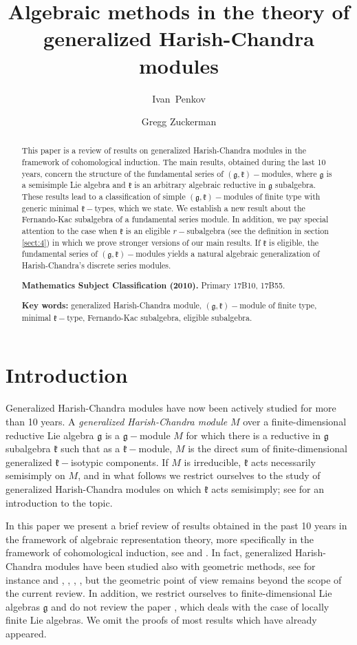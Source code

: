 \documentclass[10pt]{amsart}
\title[Algebraic methods in the theory of generalized Harish-Chandra modules]{Algebraic methods in the theory of generalized Harish-Chandra modules}
\author[Ivan Penkov]{\;Ivan~Penkov}
\author[Gregg Zuckerman]{\;Gregg Zuckerman}
\renewcommand{\gg}{\mathfrak{g}}
\newcommand{\kk}{\mathfrak{k}}
\begin{document}
\begin{abstract}
This paper is a review of results on generalized Harish-Chandra modules in the framework of cohomological induction. The main results, obtained during the last 10 years, concern the structure of the fundamental series of $(\gg,\kk)-$modules, where $\gg$ is a semisimple Lie algebra and $\kk$ is an arbitrary algebraic reductive in $\gg$ subalgebra. These results lead to a classification of simple $(\gg,\kk)-$modules of finite type with generic minimal $\kk-$types, which we state. We establish a new result about the Fernando-Kac subalgebra of a fundamental series module. In addition, we pay special attention to the case when $\kk$ is an eligible $r-$subalgebra (see the definition in section \ref{sect:4}) in which we prove stronger versions of our main results. If $\kk$ is eligible, the fundamental series of $(\gg,\kk)-$modules yields a natural algebraic generalization of Harish-Chandra's discrete series modules. 

\textbf{Mathematics Subject Classification (2010).} Primary 17B10, 17B55. 

\textbf{Key words:} generalized Harish-Chandra module, $(\gg,\kk)-$module of finite type, minimal $\kk-$type, Fernando-Kac subalgebra, eligible subalgebra.
\end{abstract}

\maketitle

\section*{Introduction}\label{sect:intro}
Generalized Harish-Chandra modules have now been actively studied for more than 10 years. A \textit{generalized Harish-Chandra module} $M$ over a finite-dimensional reductive Lie algebra $\gg$ is a $\gg-$module $M$ for which there is a reductive in $\gg$ subalgebra $\kk$ such that as a $\kk-$module, $M$ is the direct sum of finite-dimensional generalized $\kk-$isotypic components. If $M$ is irreducible, $\kk$ acts necessarily semisimply on $M$, and in what follows we restrict ourselves to the study of generalized Harish-Chandra modules on which $\kk$ acts semisimply; see \cite{Z} for an introduction to the topic.

In this paper we present a brief review of results obtained in the past 10 years in the framework of algebraic representation theory, more specifically in the framework of cohomological induction, see \cite{KV} and \cite{Z}. In fact, generalized Harish-Chandra modules have been studied also with geometric methods, see for instance \cite{PSZ} and \cite{PS1}, \cite{PS2}, \cite{PS3}, \cite{Pe}, but the geometric point of view remains beyond the scope of the current review. In addition, we restrict ourselves to finite-dimensional Lie algebras $\gg$ and do not review the paper \cite{PZ4}, which deals with the case of locally finite Lie algebras. We omit the proofs of most results which have already appeared.
\end{document}
